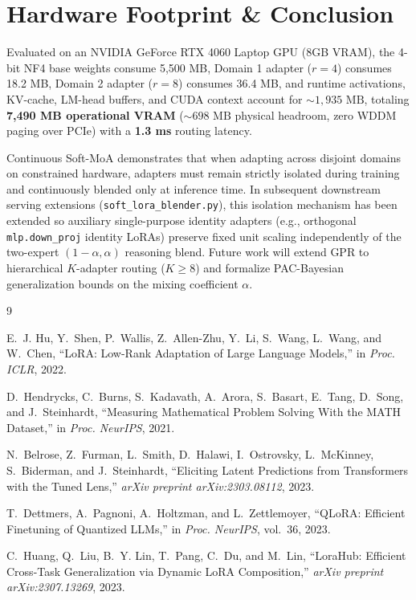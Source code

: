 \documentclass[11pt,a4paper]{article}
\begin{document}
\section{Hardware Footprint \& Conclusion}

Evaluated on an NVIDIA GeForce RTX 4060 Laptop GPU (8GB VRAM), the 4-bit NF4 base weights consume 5,500 MB, Domain 1 adapter ($r=4$) consumes 18.2 MB, Domain 2 adapter ($r=8$) consumes 36.4 MB, and runtime activations, KV-cache, LM-head buffers, and CUDA context account for $\sim 1,935\text{ MB}$, totaling \textbf{7,490 MB operational VRAM} ($\sim 698\text{ MB}$ physical headroom, zero WDDM paging over PCIe) with a \textbf{1.3 ms} routing latency.

Continuous Soft-MoA demonstrates that when adapting across disjoint domains on constrained hardware, adapters must remain strictly isolated during training and continuously blended only at inference time. In subsequent downstream serving extensions (\texttt{soft\_lora\_blender.py}), this isolation mechanism has been extended so auxiliary single-purpose identity adapters (e.g., orthogonal \texttt{mlp.down\_proj} identity LoRAs) preserve fixed unit scaling independently of the two-expert $(1-\alpha, \alpha)$ reasoning blend. Future work will extend GPR to hierarchical $K$-adapter routing ($K \ge 8$) and formalize PAC-Bayesian generalization bounds on the mixing coefficient $\alpha$.

\begin{thebibliography}{9}

E.~J. Hu, Y.~Shen, P.~Wallis, Z.~Allen-Zhu, Y.~Li, S.~Wang, L.~Wang, and W.~Chen, ``LoRA: Low-Rank Adaptation of Large Language Models,'' in \textit{Proc. ICLR}, 2022.

D.~Hendrycks, C.~Burns, S.~Kadavath, A.~Arora, S.~Basart, E.~Tang, D.~Song, and J.~Steinhardt, ``Measuring Mathematical Problem Solving With the MATH Dataset,'' in \textit{Proc. NeurIPS}, 2021.

N.~Belrose, Z.~Furman, L.~Smith, D.~Halawi, I.~Ostrovsky, L.~McKinney, S.~Biderman, and J.~Steinhardt, ``Eliciting Latent Predictions from Transformers with the Tuned Lens,'' \textit{arXiv preprint arXiv:2303.08112}, 2023.

T.~Dettmers, A.~Pagnoni, A.~Holtzman, and L.~Zettlemoyer, ``QLoRA: Efficient Finetuning of Quantized LLMs,'' in \textit{Proc. NeurIPS}, vol.~36, 2023.

C.~Huang, Q.~Liu, B.~Y. Lin, T.~Pang, C.~Du, and M.~Lin, ``LoraHub: Efficient Cross-Task Generalization via Dynamic LoRA Composition,'' \textit{arXiv preprint arXiv:2307.13269}, 2023.

\end{thebibliography}
\end{document}

